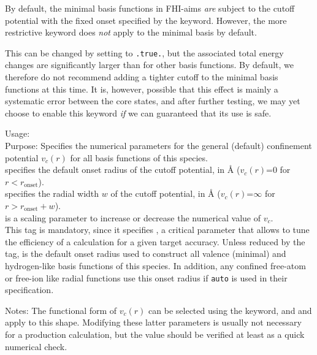 By default, the minimal basis functions in FHI-aims \emph{are} subject
to the cutoff potential with the fixed onset specified by the
 keyword. However, the more restrictive
 keyword does \emph{not} apply
to the minimal basis by default.

This can be changed by setting
 to \texttt{.true.}, but the
associated total energy changes are significantly larger than for
other basis functions. By default, we therefore do not recommend
adding a tighter cutoff to the minimal basis functions at this
time. It is, however, possible that this effect is mainly a systematic
error between the core states, and after further testing, we may yet
choose to enable this keyword \emph{if} we can guaranteed that its
use is safe.

{
  \noindent
  Usage:   
     \\[1.0ex]
  Purpose: Specifies the numerical parameters for the general
    (default) confinement potential $v_c(r)$ for all basis functions of this
    species. \\[1.0ex]
   specifies the default onset radius of the cutoff
    potential, in {\AA} ($v_c(r)$=0 for $r<r_\text{onset}$). \\
   specifies the radial width $w$ of the cutoff potential,
    in {\AA} ($v_c(r)$=$\infty$ for $r>r_\text{onset}+w$). \\
   is a scaling parameter to increase or decrease the
    numerical value of $v_c$. \\
}
This tag is mandatory, since it specifies , a critical
parameter that allows to tune the efficiency of a calculation for
a given target 
accuracy. Unless reduced by the
 tag,  is the
default onset radius used to construct all valence (minimal) and
hydrogen-like basis functions of this species. In addition, any
confined free-atom or free-ion like radial functions use this onset
radius if \texttt{auto} is used in their specification.

Notes: The functional form of $v_c(r)$ can be selected using the
 keyword, and 
and  apply to this shape. Modifying these latter
parameters is usually not necessary for a production calculation, but
the  value should be verified at least as a quick
numerical check.

